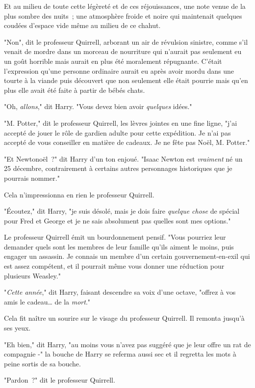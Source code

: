 Et au milieu de toute cette légèreté et de ces réjouissances, une note venue de la plus sombre des nuits~; une atmosphère froide et noire qui maintenait quelques coudées d'espace vide même au milieu de ce chahut.

"Non", dit le professeur Quirrell, arborant un air de révulsion sinistre, comme s'il venait de mordre dans un morceau de nourriture qui n'aurait pas seulement eu un goût horrible mais aurait en plus été moralement répugnante. C'était l'expression qu'une personne ordinaire aurait eu après avoir mordu dans une tourte à la viande puis découvert que non seulement elle était pourrie mais qu'en plus elle avait été faite à partir de bébés chats.

"Oh, \emph{allons}," dit Harry. "Vous devez bien avoir \emph{quelques} idées."

"M. Potter," dit le professeur Quirrell, les lèvres jointes en une fine ligne, "j'ai accepté de jouer le rôle de gardien adulte pour cette expédition. Je n'ai pas accepté de vous conseiller en matière de cadeaux. Je ne fête pas Noël, M. Potter."

"Et Newtonoël~?" dit Harry d'un ton enjoué. "Isaac Newton est \emph{vraiment} né un 25 décembre, contrairement à certains autres personnages historiques que je pourrais nommer."

Cela n'impressionna en rien le professeur Quirrell.

"Écoutez," dit Harry, "je suis désolé, mais je dois faire \emph{quelque chose} de spécial pour Fred et George et je ne sais absolument pas quelles sont mes options."

Le professeur Quirrell émit un bourdonnement pensif. "Vous pourriez leur demander quels sont les membres de leur famille qu'ils aiment le moins, puis engager un assassin. Je connais un membre d'un certain gouvernement-en-exil qui est assez compétent, et il pourrait même vous donner une réduction pour plusieurs Weasley."

"\emph{Cette année}," dit Harry, faisant descendre sa voix d'une octave, "offrez à vos amis le cadeau… de la \emph{mort}."

Cela fit naître un sourire sur le visage du professeur Quirrell. Il remonta jusqu'à ses yeux.

"Eh bien," dit Harry, "au moins vous n'avez pas suggéré que je leur offre un rat de compagnie -" la bouche de Harry se referma aussi sec et il regretta les mots à peine sortis de sa bouche.

"Pardon~?" dit le professeur Quirrell.

